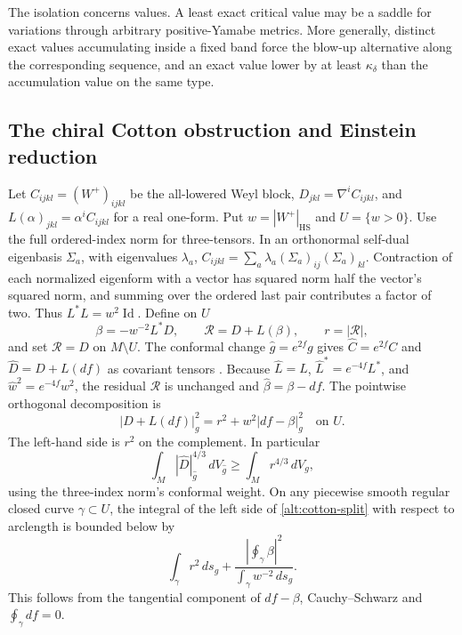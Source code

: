 The isolation concerns values. A least exact critical value
may be a saddle for variations through arbitrary positive-Yamabe
metrics. More generally, distinct exact values accumulating
inside a fixed band force the blow-up alternative along the
corresponding sequence, and an exact value lower by at least
\(\kappa_\delta\) than the accumulation value on the same type.

\subsection{The chiral Cotton obstruction and Einstein reduction}

Let \(C_{ijkl}=(W^+)_{ijkl}\) be the all-lowered Weyl block,
\(D_{jkl}=\nabla^i C_{ijkl}\), and
\(L(\alpha)_{jkl}=\alpha^iC_{ijkl}\) for a real one-form.
Put \(w=|W^+|_{\mathrm{HS}}\) and \(U=\{w>0\}\).
Use the full ordered-index norm for three-tensors.
In an orthonormal self-dual eigenbasis \(\Sigma_a\), with
eigenvalues \(\lambda_a\),
\(C_{ijkl}=\sum_a\lambda_a(\Sigma_a)_{ij}(\Sigma_a)_{kl}\).
Contraction of each normalized eigenform with a vector has
squared norm half the vector's squared norm, and summing
over the ordered last pair contributes a factor of two.
Thus \(L^*L=w^2\operatorname{Id}\). Define on \(U\)
\[
 \beta=-w^{-2}L^*D,\qquad
 \mathcal R=D+L(\beta),\qquad r=|\mathcal R|,
\]
and set \(\mathcal R=D\) on \(M\setminus U\).
The conformal change \(\widehat g=e^{2f}g\) gives
\(\widehat C=e^{2f}C\) and \(\widehat D=D+L(df)\) as covariant
tensors \cite[equations (3.3)--(3.4)]{GurskyMcKeownTyrrell2026}.
Because \(\widehat L=L\), \(\widehat L^*=e^{-4f}L^*\), and
\(\widehat w^2=e^{-4f}w^2\), the residual \(\mathcal R\) is
unchanged and \(\widehat\beta=\beta-df\). The pointwise orthogonal
decomposition is
\begin{equation}\label{alt:cotton-split}
 |D+L(df)|_g^2=r^2+w^2|df-\beta|_g^2 \quad\text{on } U.
\end{equation}
The left-hand side is \(r^2\) on the complement.
In particular
\[
 \int_M |\widehat D|_{\widehat g}^{4/3}\,dV_{\widehat g}
 \ge\int_M r^{4/3}\,dV_g ,
\]
using the three-index norm's conformal weight. On any piecewise
smooth regular closed curve \(\gamma\subset U\), the integral
of the left side of \eqref{alt:cotton-split} with respect to
arclength is bounded below by
\[
 \int_\gamma r^2\,ds_g+
         \frac{|\oint_\gamma\beta|^2}{\int_\gamma w^{-2}\,ds_g}.
\]
This follows from the tangential component of \(df-\beta\),
Cauchy--Schwarz and \(\oint_\gamma df=0\).

